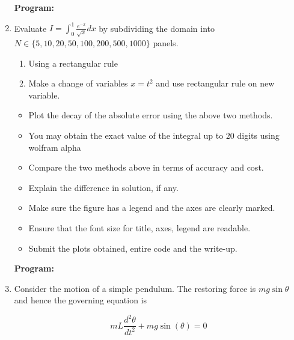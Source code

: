 \documentclass[a4paper,11pt]{report}
\begin{document}
\begin{enumerate}
    \textbf{Program:}
    

    \begin{figure}[ht!]
    \centering
    \resizebox{0.9\linewidth}{!}{}
    \end{figure}

    \item Evaluate $I = \displaystyle \int_{0}^{1} \frac{e^{-x}}{\sqrt{x}} dx$ by
    subdividing the domain into $N \in \{5, 10, 20, 50, 100, 200, 500, 1000\}$ panels.

    \begin{enumerate}
    \item Using a rectangular rule
    \item Make a change of variables $x = t^{2}$ and use rectangular rule on new variable.
    \end{enumerate}

    \begin{itemize}
    \item Plot the decay of the absolute error using the above two methods.
    \item You may obtain the exact value of the integral up to $20$ digits using wolfram alpha
    \item Compare the two methods above in terms of accuracy and cost.
    \item Explain the difference in solution, if any.
    \item Make sure the figure has a legend and the axes are clearly marked.
    \item Ensure that the font size for title, axes, legend are readable.
    \item Submit the plots obtained, entire code and the write-up.
    \end{itemize}

    \textbf{Program:}
    

    \begin{figure}[ht!]
    \centering
    \resizebox{0.9\linewidth}{!}{}
    \end{figure}

    \item Consider the motion of a simple pendulum. The restoring force is $mg \sin \theta$
    and hence the governing equation is

    \begin{equation*}
    mL \frac{d^{2} \theta}{dt^{2}} + mg \sin(\theta) = 0
    \end{equation*}


\end{enumerate}
\end{document}
